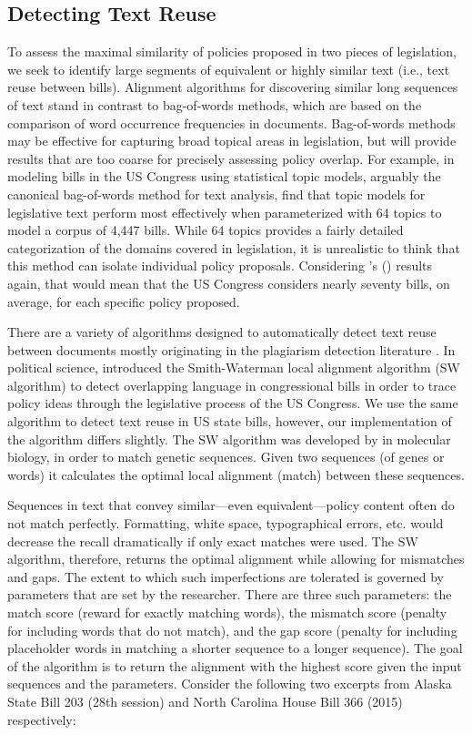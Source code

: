 \documentclass[12pt]{article} %
\def\citeapos#1{\citeauthor{#1}'s (\citeyear{#1})}
\begin{document}
\subsection{Detecting Text Reuse}
\label{sec:d_t_r}
To assess the maximal similarity of policies proposed in two pieces of legislation, we seek to identify large segments of equivalent or highly similar text (i.e., text reuse between bills). Alignment algorithms for discovering similar long sequences of text stand in contrast to bag-of-words methods, which are based on the comparison of word occurrence frequencies in documents. Bag-of-words methods may be effective for capturing broad topical areas in legislation, but will provide results that are too coarse for precisely assessing policy overlap. For example, in modeling bills in the US Congress using statistical topic models, arguably the canonical bag-of-words method for text analysis, \citet{gerrish2011predicting} find that topic models for legislative text perform most effectively when parameterized with 64 topics to model a corpus of 4,447 bills. While 64 topics provides a fairly detailed categorization of the domains covered in legislation, it is unrealistic to think that this method can isolate individual policy proposals.  Considering \citeapos{gerrish2011predicting} results again, that would mean that the US Congress considers nearly seventy bills, on average, for each specific policy proposed. 

There are a variety of algorithms designed to automatically detect text reuse
between documents mostly originating in the plagiarism detection literature
\citep[see e.g.][for an overview]{potthast2013overview}. In political science,
\citet{wilkerson2015tracing} introduced the Smith-Waterman local alignment
algorithm (SW algorithm) to detect overlapping language in congressional bills
in order to trace policy ideas through the legislative process of the US
Congress. We use the same algorithm to detect text reuse in US state bills,
however, our implementation of the algorithm differs slightly. The SW algorithm
was developed by \citet{smith1981identification} in molecular biology, in order
to match genetic sequences. Given two sequences (of genes or words) it
calculates the optimal local alignment (match) between these sequences. 

Sequences in text that convey similar---even equivalent---policy content often
do not match perfectly. Formatting, white space, typographical errors, etc.
would decrease the recall dramatically if only exact matches were used. The SW
algorithm, therefore, returns the optimal alignment while allowing for
mismatches and gaps. The extent to which such imperfections are tolerated is
governed by parameters that are set by the researcher. There are three such
parameters: the match score (reward for exactly matching words), the mismatch
score (penalty for including words that do not match), and the gap score
(penalty for including placeholder words in matching a shorter sequence to a
longer sequence). The goal of the algorithm is to return the alignment with the highest score given the input sequences and the parameters. Consider the following two excerpts from Alaska State Bill 203 (28th session) and North Carolina House Bill 366 (2015) respectively:
\end{document}
